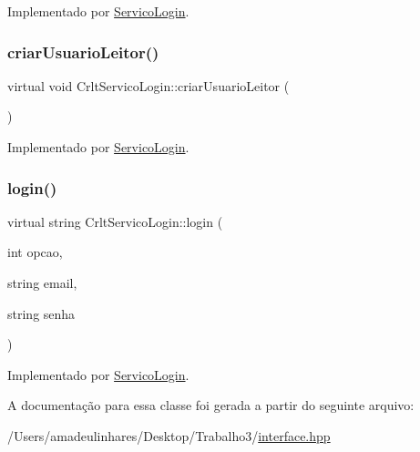 Implementado por \mbox{\hyperlink{class_servico_login_aff5fc69ce9c3fa82c6c575f025ac2a34}{Servico\+Login}}.

\mbox{\label{class_crlt_servico_login_ab5fdf7e56eb8edd6113386011f161085}} 
\subsubsection{\texorpdfstring{criar\+Usuario\+Leitor()}{criarUsuarioLeitor()}}
{\footnotesize\ttfamily virtual void Crlt\+Servico\+Login\+::criar\+Usuario\+Leitor (\begin{DoxyParamCaption}{ }\end{DoxyParamCaption})\hspace{0.3cm}{\ttfamily [pure virtual]}}



Implementado por \mbox{\hyperlink{class_servico_login_ae6786007e98ac8288dc53d025d5f5bcd}{Servico\+Login}}.

\mbox{\label{class_crlt_servico_login_a3a863ed6ef16279d0cdc1d33fd8f5edd}} 
\subsubsection{\texorpdfstring{login()}{login()}}
{\footnotesize\ttfamily virtual string Crlt\+Servico\+Login\+::login (\begin{DoxyParamCaption}\item[{int}]{opcao,  }\item[{string}]{email,  }\item[{string}]{senha }\end{DoxyParamCaption})\hspace{0.3cm}{\ttfamily [pure virtual]}}



Implementado por \mbox{\hyperlink{class_servico_login_a0dd44bd72da82fa932e4929edbefb6ea}{Servico\+Login}}.



A documentação para essa classe foi gerada a partir do seguinte arquivo\+:\begin{DoxyCompactItemize}
\item 
/\+Users/amadeulinhares/\+Desktop/\+Trabalho3/\mbox{\hyperlink{interface_8hpp}{interface.\+hpp}}\end{DoxyCompactItemize}
